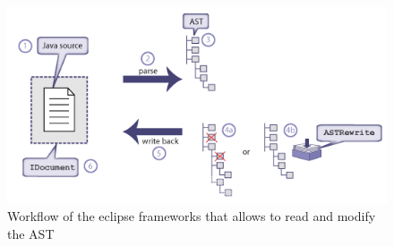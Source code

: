 \begin{figure}
\centering
\includegraphics{Bilder/workflowAST.png}
\caption[Workflow of the eclipse frameworks that allows to read and modify the \acf{AST}]{Workflow of the eclipse frameworks that allows to read and modify the \acf{AST}}
\label{picture:workflowast}
\end{figure}

